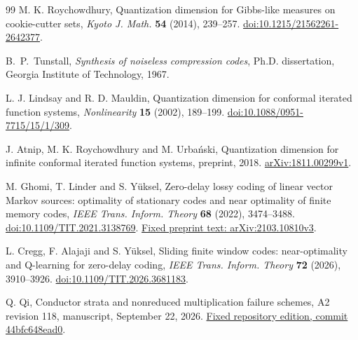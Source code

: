 \begin{thebibliography}{99}
M. K. Roychowdhury, Quantization dimension for Gibbs-like measures
on cookie-cutter sets, \emph{Kyoto J. Math.} \textbf{54} (2014),
239--257.
\href{https://doi.org/10.1215/21562261-2642377}{doi:10.1215/21562261-2642377}.

B.~P.~Tunstall, \emph{Synthesis of noiseless compression codes},
Ph.D. dissertation, Georgia Institute of Technology, 1967.

L. J. Lindsay and R. D. Mauldin, Quantization dimension for conformal
iterated function systems, \emph{Nonlinearity} \textbf{15} (2002), 189--199.
\href{https://doi.org/10.1088/0951-7715/15/1/309}{doi:10.1088/0951-7715/15/1/309}.

J. Atnip, M. K. Roychowdhury and M. Urba\'nski,
Quantization dimension for infinite conformal iterated function systems,
preprint, 2018. \href{https://arxiv.org/abs/1811.00299v1}{arXiv:1811.00299v1}.

M. Ghomi, T. Linder and S. Y\"uksel,
Zero-delay lossy coding of linear vector Markov sources: optimality of
stationary codes and near optimality of finite memory codes,
\emph{IEEE Trans. Inform. Theory} \textbf{68} (2022), 3474--3488.
\href{https://doi.org/10.1109/TIT.2021.3138769}{doi:10.1109/TIT.2021.3138769}.
\href{https://arxiv.org/abs/2103.10810v3}{Fixed preprint text: arXiv:2103.10810v3}.

L. Cregg, F. Alajaji and S. Y\"uksel,
Sliding finite window codes: near-optimality and Q-learning for zero-delay
coding, \emph{IEEE Trans. Inform. Theory} \textbf{72} (2026), 3910--3926.
\href{https://doi.org/10.1109/TIT.2026.3681183}{doi:10.1109/TIT.2026.3681183}.

Q. Qi, Conductor strata and nonreduced multiplication failure schemes,
A2 revision 118, manuscript, September 22, 2026.
\href{https://github.com/TrillionniumFoundation/theta-theory/tree/44bfc648ead008896a6981a7302a6d5ab8b21bb8/papers/A2-v17-boundary-information-coarsening/article/v118}{Fixed repository edition, commit 44bfc648ead0}.

\end{thebibliography}

